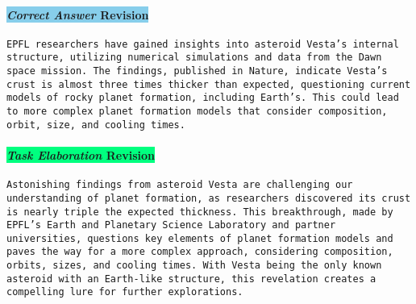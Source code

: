 \paragraph{\colorbox{SkyBlue}{\textit{Correct Answer} Revision}}
\texttt{EPFL researchers have gained insights into asteroid Vesta's internal structure, utilizing numerical simulations and data from the Dawn space mission. The findings, published in Nature, indicate Vesta's crust is almost three times thicker than expected, questioning current models of rocky planet formation, including Earth's. This could lead to more complex planet formation models that consider composition, orbit, size, and cooling times.}

\paragraph{\colorbox{SpringGreen}{\textit{Task Elaboration} Revision}}
\texttt{Astonishing findings from asteroid Vesta are challenging our understanding of planet formation, as researchers discovered its crust is nearly triple the expected thickness. This breakthrough, made by EPFL's Earth and Planetary Science Laboratory and partner universities, questions key elements of planet formation models and paves the way for a more complex approach, considering composition, orbits, sizes, and cooling times. With Vesta being the only known asteroid with an Earth-like structure, this revelation creates a compelling lure for further explorations.}